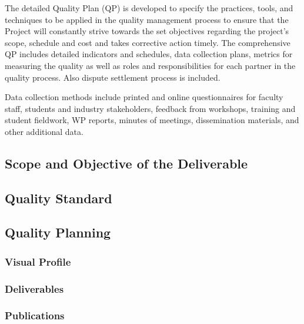 \documentclass[
  11pt,
]{article}
\begin{document}
The detailed Quality Plan (QP) is developed to specify the practices,
tools, and techniques to be applied in the quality management process to
ensure that the Project will constantly strive towards the set
objectives regarding the project's scope, schedule and cost and takes
corrective action timely. The comprehensive QP includes detailed
indicators and schedules, data collection plans, metrics for measuring
the quality as well as roles and responsibilities for each partner in
the quality process. Also dispute settlement process is included.

Data collection methods include printed and online questionnaires for
faculty staff, students and industry stakeholders, feedback from
workshops, training and student fieldwork, WP reports, minutes of
meetings, dissemination materials, and other additional data.

\hypertarget{scope-and-objective-of-the-deliverable}{%
\subsection{Scope and Objective of the
Deliverable}\label{scope-and-objective-of-the-deliverable}}

\hypertarget{quality-standard}{%
\subsection{Quality Standard}\label{quality-standard}}

\hypertarget{quality-planning-1}{%
\subsection{Quality Planning}\label{quality-planning-1}}

\hypertarget{visual-profile}{%
\subsubsection{Visual Profile}\label{visual-profile}}

\hypertarget{deliverables}{%
\subsubsection{Deliverables}\label{deliverables}}

\hypertarget{publications}{%
\subsubsection{Publications}\label{publications}}
\end{document}
